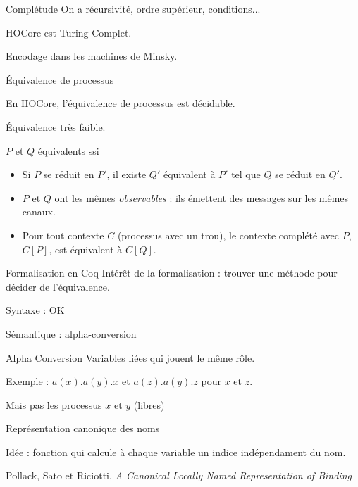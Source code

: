 \documentclass{beamer}
\begin{document}
\begin{frame}{Complétude}
On a récursivité, ordre supérieur, conditions...

HOCore est Turing-Complet.

Encodage dans les machines de Minsky.
\end{frame}
 
\begin{frame}{Équivalence de processus}
\begin{center}
En HOCore, l'équivalence de processus est décidable.
\end{center}
Équivalence très faible. 

$P$ et $Q$ équivalents ssi \begin{itemize}
\item Si $P$ se réduit en $P'$, il existe $Q'$ équivalent à $P'$ tel que $Q$ se réduit en $Q'$. 
\item $P$ et $Q$ ont les mêmes \textit{observables} : ils émettent des messages sur les mêmes canaux.  
\item Pour tout contexte $C$ (processus avec un trou), le contexte complété avec $P$, $C[P]$, est équivalent à $C[Q]$.
\end{itemize}
\end{frame}

\begin{frame}{Formalisation en Coq}
Intérêt de la formalisation : trouver une méthode pour décider de l'équivalence.

Syntaxe : OK

Sémantique : alpha-conversion

\begin{exampleblock}{Alpha Conversion}
Variables liées qui jouent le même rôle.

Exemple : $a(x).a(y).x$ et $a(z).a(y).z$ pour $x$ et $z$.

Mais pas les processus $x$ et $y$ (libres)
\end{exampleblock}
\end{frame}

\begin{frame}{Représentation canonique des noms}

Idée : fonction qui calcule à chaque variable un indice indépendament du nom.

Pollack, Sato et Riciotti, \textit{A Canonical Locally Named Representation of Binding}

\end{frame}
\end{document}
